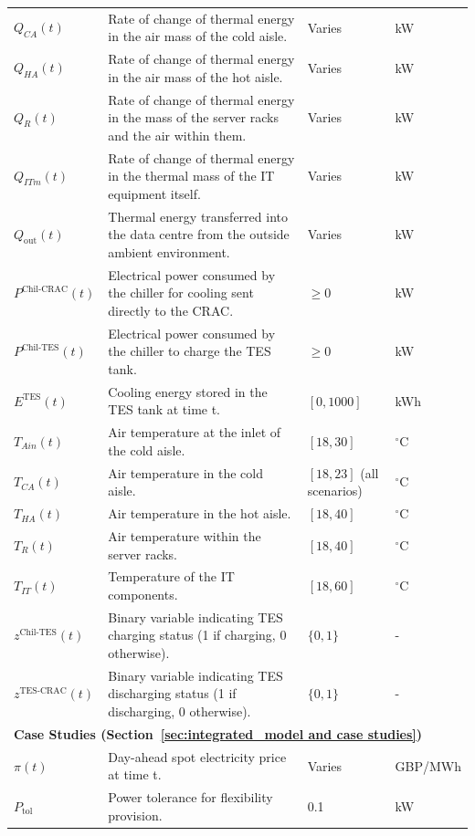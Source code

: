 \documentclass[lettersize,journal]{IEEEtran}
\begin{document}
{{\begin{longtable}{p{} p{} p{} p{}}
$Q_{CA}(t)$ & Rate of change of thermal energy in the air mass of the cold aisle. & Varies &kW \\
$Q_{HA}(t)$ & Rate of change of thermal energy in the air mass of the hot aisle. & Varies &kW \\
$Q_{R}(t)$ & Rate of change of thermal energy in the mass of the server racks and the air within them. & Varies &kW \\
$Q_{ITm}(t)$ & Rate of change of thermal energy in the thermal mass of the IT equipment itself. & Varies &kW \\
$Q_{\mathrm{out}}(t)$ & Thermal energy transferred into the data centre from the outside ambient environment. & Varies &kW \\
$P^{\mathrm{Chil}\text{-}\mathrm{CRAC}}(t)$ & Electrical power consumed by the chiller for cooling sent directly to the CRAC. & $\geq 0$ &kW \\
$P^{\mathrm{Chil}\text{-}\mathrm{TES}}(t)$ & Electrical power consumed by the chiller to charge the TES tank. & $\geq 0$ &kW \\
$E^{\mathrm{TES}}(t)$ & Cooling energy stored in the TES tank at time t. & $[0, 1000]$ &kWh \\
$T_{Ain}(t)$ & Air temperature at the inlet of the cold aisle. & $[18, 30]$ & $^{\circ}$C \\
$T_{CA}(t)$ & Air temperature in the cold aisle. & $[18, 23]$ (all scenarios) & $^{\circ}$C \\
$T_{HA}(t)$ & Air temperature in the hot aisle. & $[18, 40]$ & $^{\circ}$C \\
$T_{R}(t)$ & Air temperature within the server racks. & $[18, 40]$ & $^{\circ}$C \\
$T_{IT}(t)$ & Temperature of the IT components. & $[18, 60]$ & $^{\circ}$C \\
$z^{\mathrm{Chil}\text{-}\mathrm{TES}}(t)$ & Binary variable indicating TES charging status (1 if charging, 0 otherwise). & $\{0, 1\}$ & - \\
$z^{\mathrm{TES}\text{-}\mathrm{CRAC}}(t)$ & Binary variable indicating TES discharging status (1 if discharging, 0 otherwise). & $\{0, 1\}$ & - \\
\midrule
\multicolumn{4}{l}{\textbf{Case Studies (Section~\ref{sec:integrated_model and case studies})}} \\
\midrule
$\pi(t)$ & Day-ahead spot electricity price at time t. & Varies & GBP/MWh \\
$P_{\mathrm{tol}}$ & Power tolerance for flexibility provision. & 0.1 &kW \\

\end{longtable}}}
\end{document}
